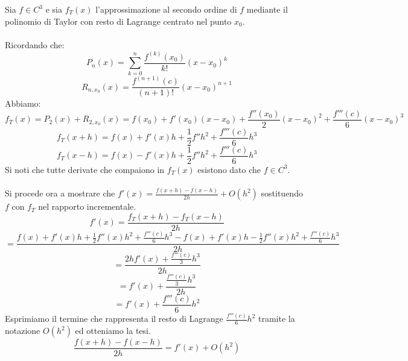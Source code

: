 \begin{center}
\footnotesize\noindent{}\end{center}

\noindent Sia \(f \in C^3\) e sia \(f_T(x)\) l'approssimazione al secondo ordine di \(f\) mediante il polinomio di Taylor con resto di Lagrange centrato nel punto \(x_0\).
\\
\\
\noindent Ricordando che:
\[
P_n(x) = \sum_{k=0}^n{ \frac{f^{(k)} (x_0)}{k!}(x-x_0)^k}
\]
\[
R_{n,x_0}(x) = \frac{f^{(n+1)}(c)}{(n+1)!}(x-x_0)^{n+1}
\]
\noindent Abbiamo:
\[
f_T(x) = P_2(x) + R_{2, x_0}(x) = f(x_0) + f'(x_0)(x-x_0) + \frac{f''(x_0)}{2}(x-x_0)^2 + \frac{f'''(c)}{6}(x-x_0)^3
\]
\[
f_T(x + h) = f(x) + f'(x)h + \frac{1}{2} f''h^2 + \frac{f'''(c)}{6}h^3
\]
\[
f_T(x - h) = f(x) - f'(x)h + \frac{1}{2} f''h^2 + \frac{f'''(c)}{6}h^3
\]
\noindent Si noti che tutte derivate che compaiono in \(f_T(x)\) esistono dato che \(f \in C^3\).
\\
\\
\noindent Si procede ora a mostrare che \(f'(x) = \frac{f(x+h)-f(x-h)}{2h} + O(h^2)\) sostituendo \(f\) con \(f_T\) nel rapporto incrementale.
\\
\[
f'(x) = \frac{f_T(x + h) - f_T(x - h)}{2h}
\]
\[
= \frac{
	f(x) + f'(x)h + \frac{1}{2} f''(x)h^2 + \frac{f'''(c)}{6}h^3
	-
	f(x) + f'(x)h - \frac{1}{2} f''(x)h^2 + \frac{f'''(c)}{6}h^3
}{2h}
\]
\[
= \frac{2hf'(x) + \frac{f'''(c)}{3}h^3}{2h}
\]
\[
= f'(x) + \frac{\frac{f'''(c)}{3}h^3}{2h}
\]
\[
= f'(x) + \frac{f'''(c)}{6}h^2
\]
\noindent Esprimiamo il termine che rappresenta il resto di Lagrange \(\frac{f'''(c)}{6}h^2\) tramite la notazione \(O(h^2)\) ed otteniamo la tesi.
\[
\frac{f(x+h)-f(x-h)}{2h} = f'(x) + O(h^2)
\]
